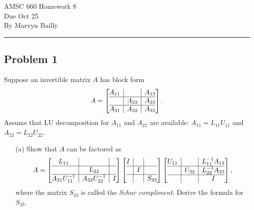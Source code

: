 \documentclass[12pt]{report}
\begin{document}
\large
\begin{center}
AMSC 660 Homework 8\\
Due Oct 25\\
By Marvyn Bailly\\
\end{center}
\normalsize
\hrule



\begin{problem}%
\subsection*{Problem 1}
Suppose an invertible matrix $A$ has block form
\[
  A = \left[
    \begin{array}{@{}c|c|c@{}}
    A_{11} &&A_{13}\\\hline
    &A_{22}&A_{23}\\\hline
    A_{31} &A_{32} &A_{33}\\
  \end{array}
  \right].
\]
Assume that LU decomposition for $A_{11}$ and $A_{22}$ are available: $A_{11} = L_{11}U_{11}$ and $A_{22} = L_{22}U_{22}$.
\begin{enumerate}
    \item [(a)]
    Show that $A$ can be factored as
    \[
        A = \left[
            \begin{array}{@{}c|c|c@{}}
            L_{11} &&\\\hline
            &L_{22}&\\\hline
            A_{31}U_{11}^{-1} &A_{32}U_{22}^{-1} &I\\
          \end{array}
          \right]\left[
            \begin{array}{@{}c|c|c@{}}
            I &&\\\hline
            &I&\\\hline
            &&S_{33}\\
          \end{array}
          \right]\left[
            \begin{array}{@{}c|c|c@{}}
            U_{11} &&L_{11}^{-1}A_{13}\\\hline
            &U_{22}&L_{22}^{-1}A_{23}\\\hline
            &&I\\
          \end{array}
          \right],
    \]
    where the matrix $S_{33}$ is called the \textit{Schur compliment}. Derive the formula for $S_{33}$. 


\end{enumerate}
\end{problem}
\end{document}

